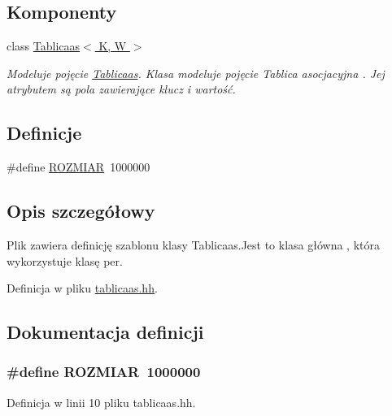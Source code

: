 \subsection*{Komponenty}
\begin{DoxyCompactItemize}
\item 
class \hyperlink{class_tablicaas}{Tablicaas$<$ K, W $>$}
\begin{DoxyCompactList}\small\item\em Modeluje pojęcie \hyperlink{class_tablicaas}{Tablicaas}. Klasa modeluje pojęcie Tablica asocjacyjna . Jej atrybutem są pola zawierające klucz i wartość. \end{DoxyCompactList}\end{DoxyCompactItemize}
\subsection*{Definicje}
\begin{DoxyCompactItemize}
\item 
\#define \hyperlink{tablicaas_8hh_aa50aa866c5823769bb02e986d29a0589}{R\-O\-Z\-M\-I\-A\-R}~1000000
\end{DoxyCompactItemize}


\subsection{Opis szczegółowy}
Plik zawiera definicję szablonu klasy Tablicaas.\-Jest to klasa główna , która wykorzystuje klasę per. 

Definicja w pliku \hyperlink{tablicaas_8hh_source}{tablicaas.\-hh}.



\subsection{Dokumentacja definicji}
\hypertarget{tablicaas_8hh_aa50aa866c5823769bb02e986d29a0589}{
\subsubsection[{R\-O\-Z\-M\-I\-A\-R}]{\setlength{\rightskip}{0pt plus 5cm}\#define R\-O\-Z\-M\-I\-A\-R~1000000}}\label{tablicaas_8hh_aa50aa866c5823769bb02e986d29a0589}


Definicja w linii 10 pliku tablicaas.\-hh.

